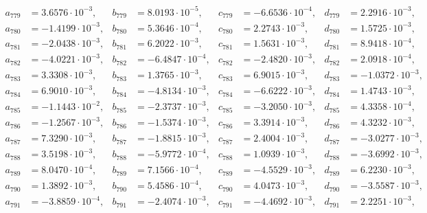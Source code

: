 \begin{align*}
  a_{ 779 } &= 3.6576 \cdot 10^{ -3 }, & b_{ 779 } &= 8.0193 \cdot 10^{ -5 }, & c_{ 779 } &= -6.6536 \cdot 10^{ -4 }, & d_{ 779 } &= 2.2916 \cdot 10^{ -3 }, \\ 
  a_{ 780 } &= -1.4199 \cdot 10^{ -3 }, & b_{ 780 } &= 5.3646 \cdot 10^{ -4 }, & c_{ 780 } &= 2.2743 \cdot 10^{ -3 }, & d_{ 780 } &= 1.5725 \cdot 10^{ -3 }, \\ 
  a_{ 781 } &= -2.0438 \cdot 10^{ -3 }, & b_{ 781 } &= 6.2022 \cdot 10^{ -3 }, & c_{ 781 } &= 1.5631 \cdot 10^{ -3 }, & d_{ 781 } &= 8.9418 \cdot 10^{ -4 }, \\ 
  a_{ 782 } &= -4.0221 \cdot 10^{ -3 }, & b_{ 782 } &= -6.4847 \cdot 10^{ -4 }, & c_{ 782 } &= -2.4820 \cdot 10^{ -3 }, & d_{ 782 } &= 2.0918 \cdot 10^{ -4 }, \\ 
  a_{ 783 } &= 3.3308 \cdot 10^{ -3 }, & b_{ 783 } &= 1.3765 \cdot 10^{ -3 }, & c_{ 783 } &= 6.9015 \cdot 10^{ -3 }, & d_{ 783 } &= -1.0372 \cdot 10^{ -3 }, \\ 
  a_{ 784 } &= 6.9010 \cdot 10^{ -3 }, & b_{ 784 } &= -4.8134 \cdot 10^{ -3 }, & c_{ 784 } &= -6.6222 \cdot 10^{ -3 }, & d_{ 784 } &= 1.4743 \cdot 10^{ -3 }, \\ 
  a_{ 785 } &= -1.1443 \cdot 10^{ -2 }, & b_{ 785 } &= -2.3737 \cdot 10^{ -3 }, & c_{ 785 } &= -3.2050 \cdot 10^{ -3 }, & d_{ 785 } &= 4.3358 \cdot 10^{ -4 }, \\ 
  a_{ 786 } &= -1.2567 \cdot 10^{ -3 }, & b_{ 786 } &= -1.5374 \cdot 10^{ -3 }, & c_{ 786 } &= 3.3914 \cdot 10^{ -3 }, & d_{ 786 } &= 4.3232 \cdot 10^{ -3 }, \\ 
  a_{ 787 } &= 7.3290 \cdot 10^{ -3 }, & b_{ 787 } &= -1.8815 \cdot 10^{ -3 }, & c_{ 787 } &= 2.4004 \cdot 10^{ -3 }, & d_{ 787 } &= -3.0277 \cdot 10^{ -3 }, \\ 
  a_{ 788 } &= 3.5198 \cdot 10^{ -3 }, & b_{ 788 } &= -5.9772 \cdot 10^{ -4 }, & c_{ 788 } &= 1.0939 \cdot 10^{ -3 }, & d_{ 788 } &= -3.6992 \cdot 10^{ -3 }, \\ 
  a_{ 789 } &= 8.0470 \cdot 10^{ -4 }, & b_{ 789 } &= 7.1566 \cdot 10^{ -4 }, & c_{ 789 } &= -4.5529 \cdot 10^{ -3 }, & d_{ 789 } &= 6.2230 \cdot 10^{ -3 }, \\ 
  a_{ 790 } &= 1.3892 \cdot 10^{ -3 }, & b_{ 790 } &= 5.4586 \cdot 10^{ -4 }, & c_{ 790 } &= 4.0473 \cdot 10^{ -3 }, & d_{ 790 } &= -3.5587 \cdot 10^{ -3 }, \\ 
  a_{ 791 } &= -3.8859 \cdot 10^{ -4 }, & b_{ 791 } &= -2.4074 \cdot 10^{ -3 }, & c_{ 791 } &= -4.4692 \cdot 10^{ -3 }, & d_{ 791 } &= 2.2251 \cdot 10^{ -3 }, \\ 

\end{align*}

